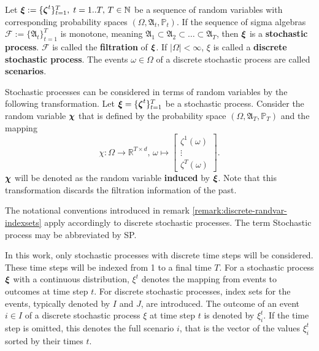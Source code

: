 \begin{definition}
\label{def:stochastic_process}
  Let $\boldsymbol\xi:=\{\boldsymbol\zeta^t\}_{t=1}^T,\; t=1..T,\, T\in\mathbb{N}$ be a sequence of random variables with corresponding probability spaces $(\Omega, \mathfrak{A}_t, \mathbb{P}_t)$.
  If the sequence of sigma algebras $\mathcal{F}:=\{\mathfrak{A}_t\}_{t=1}^T$ is monotone, meaning $\mathfrak{A}_1\subset\mathfrak{A}_2\subset\ldots\subset\mathfrak{A}_T$, then $\boldsymbol\xi$ is a \textbf{stochastic process}.
  $\mathcal{F}$ is called the \textbf{filtration} of $\boldsymbol\xi$.
  If $|\Omega|<\infty$, $\xi$ is called a \textbf{discrete stochastic process}.
  The events $\omega\in\Omega$ of a discrete stochastic process are called \textbf{scenarios}.
\end{definition}
\begin{remark}
  \label{remark:stochproc-as-randvar}
  Stochastic processes can be considered in terms of random variables by the following transformation.
  Let $\boldsymbol\xi = \{\boldsymbol\zeta^t\}_{t=1}^T$ be a stochastic process.
  Consider the random variable $\boldsymbol\chi$ that is defined by the probability space $(\Omega, \mathfrak{A}_T, \mathbb{P}_T)$ and the mapping \[\chi:\Omega\rightarrow \mathbb{R}^{T\times d},\,\omega\mapsto\left[\begin{array}{c}\zeta^1(\omega)\\\vdots\\\zeta^T(\omega)\end{array}\right].\]
  $\boldsymbol\chi$ will be denoted as the random variable \textbf{induced} by $\boldsymbol\xi$.
  Note that this transformation discards the filtration information of the past.

  The notational conventions introduced in remark \ref{remark:discrete-randvar-indexsets} apply accordingly to discrete stochastic processes.
  The term Stochastic process may be abbreviated by SP.
\end{remark}
In this work, only stochastic processes with discrete time steps will be considered.
These time steps will be indexed from 1 to a final time $T$.
For a stochastic process $\boldsymbol\xi$ with a continuous distribution, $\xi^t$ denotes the mapping from events to outcomes at time step $t$.
For discrete stochastic processes, index sets for the events, typically denoted by $I$ and $J$, are introduced.
The outcome of an event $i\in I$ of a discrete stochastic process $\xi$ at time step $t$ is denoted by $\xi_i^t$.
If the time step is omitted, this denotes the full scenario $i$, that is the vector of the values $\xi_i^t$ sorted by their times $t$.

